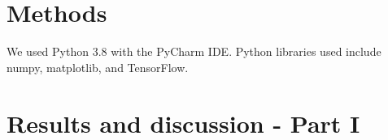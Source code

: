 \documentclass[a4paper]{article}
\begin{document}
\section{Methods}
We used Python 3.8 with the PyCharm IDE. Python libraries used include numpy, matplotlib, and TensorFlow. %


\section{Results and discussion - Part I}

%
\end{document}
